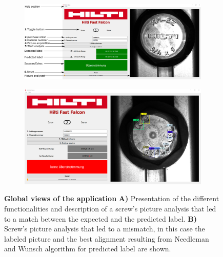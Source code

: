 \documentclass[12pt, french, a4paper]{article} %
\begin{document}
\begin{figure}[H]
 \centering
 \begin{subfigure}{0.6\textwidth}
  \includegraphics[width=\linewidth]{figure/APP_MAIN_A.pdf}
  \subcaption{}
  \label{app_view_success}
 \end{subfigure}
  \begin{subfigure}{0.6\textwidth}
  \includegraphics[width=\linewidth]{figure/screw_echec_APP_MAIN.png}
  \subcaption{}
  \label{app_view_echec}
 \end{subfigure}
 \caption{\textbf{Global views of the application} \textbf{A)} Presentation of the different functionalities and description of a screw's picture analysis that led to a match between the expected and the predicted label. \textbf{B)} Screw's picture analysis that led to a mismatch, in this case the labeled picture and the best alignment resulting from Needleman and Wunsch algorithm for predicted label are shown.}
 \label{APP_MAIN}
\end{figure}%
\end{document}
